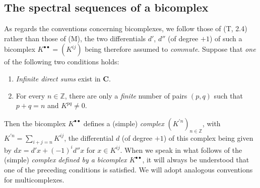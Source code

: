 \subsection{The spectral sequences of a bicomplex}
\label{subsection:0.11.3}

\begin{env}[11.3.1]
\label{0.11.3.1}
As regards the conventions concerning bicomplexes, we follow
those of (T, 2.4) rather than those of (M), the two differentials $d'$, $d''$
(of degree $+1$) of such a bicomplex
$K^{\bullet\bullet}=(K^{ij})$ being therefore assumed to \emph{commute}.
Suppose that \emph{one} of the following two conditions holds:
\begin{enumerate}
  \item[$1^\circ$] \emph{Infinite direct sums} exist in $\boldsymbol{C}$.
  \item[$2^\circ$] For every $n\in\mathbb Z$, there are only a
    \emph{finite} number of pairs $(p,q)$ such that $p+q=n$ and $K^{pq}\ne0$.
\end{enumerate}
Then the bicomplex $K^{\bullet\bullet}$ defines a (simple) \emph{complex}
$(K^{\prime n})_{n\in\mathbb Z}$, with
$K^{\prime n}=\sum_{i+j=n}K^{ij}$, the differential $d$ (of degree
$+1$) of this complex being given by
$dx=d'x+(-1)^i d''x$ for $x\in K^{ij}$. When we speak in what follows
of the (simple) \emph{complex} \emph{defined by a bicomplex $K^{\bullet\bullet}$}, it
will always be understood that one of the preceding conditions is satisfied.
We will adopt analogous conventions for multicomplexes.


\end{env}
